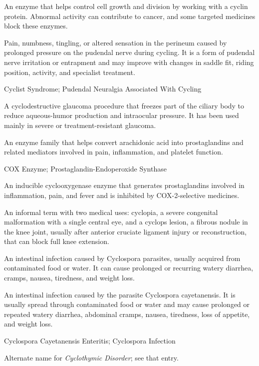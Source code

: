  An enzyme that helps control cell growth and division by working with a cyclin protein. Abnormal activity can contribute to cancer, and some targeted medicines block these enzymes.

 Pain, numbness, tingling, or altered sensation in the perineum caused by prolonged pressure on the pudendal nerve during cycling. It is a form of pudendal nerve irritation or entrapment and may improve with changes in saddle fit, riding position, activity, and specialist treatment.

\synonyms
Cyclist Syndrome; Pudendal Neuralgia Associated With Cycling

 A cyclodestructive glaucoma procedure that freezes part of the ciliary body to reduce aqueous-humor production and intraocular pressure. It has been used mainly in severe or treatment-resistant glaucoma.

 An enzyme family that helps convert arachidonic acid into prostaglandins and related mediators involved in pain, inflammation, and platelet function.

\synonyms
COX Enzyme; Prostaglandin-Endoperoxide Synthase

 An inducible cyclooxygenase enzyme that generates prostaglandins involved in inflammation, pain, and fever and is inhibited by COX-2-selective medicines.

 An informal term with two medical uses: cyclopia, a severe congenital malformation with a single central eye, and a cyclops lesion, a fibrous nodule in the knee joint, usually after anterior cruciate ligament injury or reconstruction, that can block full knee extension.

 An intestinal infection caused by Cyclospora parasites, usually acquired from contaminated food or water. It can cause prolonged or recurring watery diarrhea, cramps, nausea, tiredness, and weight loss.

 An intestinal infection caused by the parasite Cyclospora cayetanensis. It is usually spread through contaminated food or water and may cause prolonged or repeated watery diarrhea, abdominal cramps, nausea, tiredness, loss of appetite, and weight loss.

\synonyms
Cyclospora Cayetanensis Enteritis; Cyclospora Infection

 Alternate name for \textit{Cyclothymic Disorder}; see that entry.

